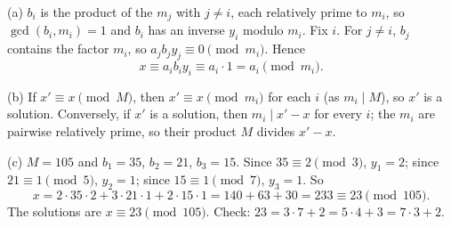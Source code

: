 (a) $b_i$ is the product of the $m_j$ with $j\ne i$, each relatively prime to $m_i$, so $\gcd(b_i,m_i)=1$ and $b_i$ has an inverse $y_i$ modulo $m_i$. Fix $i$. For $j\ne i$, $b_j$ contains the factor $m_i$, so $a_jb_jy_j\equiv0\pmod{m_i}$. Hence
\[
x\equiv a_ib_iy_i\equiv a_i\cdot1=a_i\pmod{m_i}.
\]

(b) If $x'\equiv x\pmod M$, then $x'\equiv x\pmod{m_i}$ for each $i$ (as $m_i\mid M$), so $x'$ is a solution. Conversely, if $x'$ is a solution, then $m_i\mid x'-x$ for every $i$; the $m_i$ are pairwise relatively prime, so their product $M$ divides $x'-x$.

(c) $M=105$ and $b_1=35$, $b_2=21$, $b_3=15$. Since $35\equiv2\pmod3$, $y_1=2$; since $21\equiv1\pmod5$, $y_2=1$; since $15\equiv1\pmod7$, $y_3=1$. So
\[
x=2\cdot35\cdot2+3\cdot21\cdot1+2\cdot15\cdot1=140+63+30=233\equiv23\pmod{105}.
\]
The solutions are $x\equiv\boxed{23}\pmod{105}$. Check: $23=3\cdot7+2=5\cdot4+3=7\cdot3+2$.
